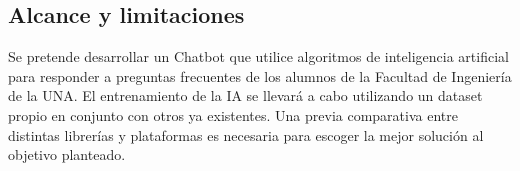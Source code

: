 \subsection{Alcance y limitaciones}

Se pretende desarrollar un Chatbot que utilice algoritmos de inteligencia artificial para responder
a preguntas frecuentes de los alumnos de la Facultad de Ingeniería de la
UNA. El entrenamiento de la IA se llevará a cabo utilizando un dataset propio en
conjunto con otros ya existentes. Una previa comparativa entre distintas librerías
y plataformas es necesaria para escoger la mejor solución al objetivo planteado.